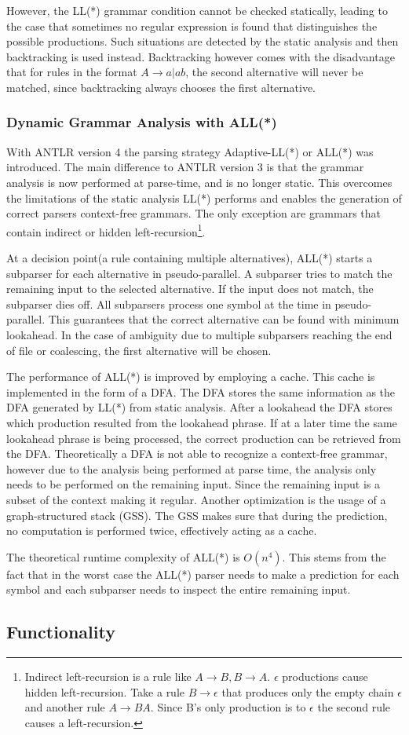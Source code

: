 However, the LL(*) grammar condition cannot be checked statically, leading to the case that sometimes no regular expression is found that distinguishes the possible productions. Such situations are detected by the static analysis and then backtracking is used instead. Backtracking however comes with the disadvantage that for rules in the format $A \rightarrow a | ab$, the second alternative will never be matched, since backtracking always chooses the first alternative. 

\subsubsection{Dynamic Grammar Analysis with ALL(*)}

With ANTLR version 4 the parsing strategy Adaptive-LL(*) or ALL(*) was introduced. The main difference to ANTLR version 3 is that the grammar analysis is now performed at parse-time, and is no longer static. This overcomes the limitations of the static analysis LL(*) performs and enables the generation of correct parsers context-free grammars. The only exception are grammars that contain indirect or hidden left-recursion\footnote{Indirect left-recursion is a rule like $A \rightarrow B, B \rightarrow A$. $\epsilon$ productions cause hidden left-recursion. Take a rule $B \rightarrow \epsilon$ that produces only the empty chain $\epsilon$ and another rule $A \rightarrow BA$. Since B's only production is to $\epsilon$ the second rule causes a left-recursion. }.

At a decision point(a rule containing multiple alternatives), ALL(*) starts a subparser for each alternative in pseudo-parallel. A subparser tries to match the remaining input to the selected alternative. If the input does not match, the subparser dies off. All subparsers process one symbol at the time in pseudo-parallel. This guarantees that the correct alternative can be found with minimum lookahead. In the case of ambiguity due to multiple subparsers reaching the end of file or coalescing, the first alternative will be chosen. 

The performance of ALL(*) is improved by employing a cache. This cache is implemented in the form of a DFA. The DFA stores the same information as the DFA generated by LL(*) from static analysis. After a lookahead the DFA stores which production resulted from the lookahead phrase. If at a later time the same lookahead phrase is being processed, the correct production can be retrieved from the DFA. Theoretically a DFA is not able to recognize a context-free grammar, however due to the analysis being performed at parse time, the analysis only needs to be performed on the remaining input. Since the remaining input is a subset of the context making it regular. Another optimization is the usage of a graph-structured stack (GSS). The GSS makes sure that during the prediction, no computation is performed twice, effectively acting as a cache. 

The theoretical runtime complexity of ALL(*) is $O(n^4)$. This stems from the fact that in the worst case the ALL(*) parser needs to make a prediction for each symbol and each subparser needs to inspect the entire remaining input. 


\subsection{Functionality}

